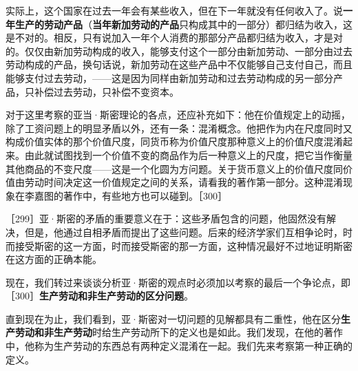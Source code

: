 实际上，这个国家在过去一年会有某些收入，但在下一年就没有任何收入了。说\textbf{一年生产的劳动产品}（\textbf{当年新加劳动的产品}只构成其中的一部分）都归结为收入，这是不对的。相反，只有说加入一年个人消费的那部分产品都归结为收入，才是对的。仅仅由新加劳动构成的收入，能够支付这个一部分由新加劳动、一部分由过去劳动构成的产品，换句话说，新加劳动在这些产品中不仅能够自己支付自己，而且能够支付过去劳动，——这是因为同样由新加劳动和过去劳动构成的另一部分产品，只补偿过去劳动，只补偿不变资本。\fontbox{\}~}


\fontbox{~\{}对于这里考察的亚当·斯密理论的各点，还应补充如下：他在价值规定上的动摇，除了工资问题上的明显矛盾以外，还有一条：混淆概念。他把作为内在尺度同时又构成价值实体的那个价值尺度，同货币称为价值尺度那种意义上的价值尺度混淆起来。由此就试图找到一个价值不变的商品作为后一种意义上的尺度，把它当作衡量其他商品的不变尺度——这是一个化圆为方问题。关于货币意义上的价值尺度同价值由劳动时间决定这一价值规定之间的关系，请看我的著作第一部分。这种混淆现象在李嘉图的著作中，有些地方也可以碰到。\fontbox{\}~}［300］


［299］亚·斯密的矛盾的重要意义在于：这些矛盾包含的问题，他固然没有解决，但是，他通过自相矛盾而提出了这些问题。后来的经济学家们互相争论时，时而接受斯密的这一方面，时而接受斯密的那一方面，这种情况最好不过地证明斯密在这方面的正确本能。


现在，我们转过来谈谈分析亚·斯密的观点时必须加以考察的最后一个争论点，即［300］\textbf{生产劳动和非生产劳动的区分问题}。

直到现在为止，我们看到，亚·斯密对一切问题的见解都具有二重性，他在区分\textbf{生产劳动和非生产劳动}时给生产劳动所下的定义也是如此。我们发现，在他的著作中，他称为生产劳动的东西总有两种定义混淆在一起。我们先来考察第一种正确的定义。


